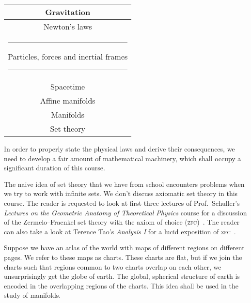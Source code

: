 \documentclass[a4 paper, 12pt]{book}
\theoremstyle{definition}
\begin{document}
    \begin{center}
        \renewcommand{\arraystretch}{1.3}
        \begin{tabular}{|c|}
            \hline
            Gravitation\\
            \hline
            Newton's laws\\
            \hline
            \rule{5pt}{0pt}Particles, forces and inertial frames\rule{5pt}{0pt}\\
            \hline
            Spacetime\\
            \hline
            Affine manifolds\\
            \hline
            Manifolds\\
            \hline
            Set theory\\
            \hline
        \end{tabular}
    \end{center}

    In order to properly state the physical laws and derive their consequences, we need to develop a fair amount of mathematical machinery, which shall occupy a significant duration of this course.

    The naive idea of set theory that we have from school encounters problems when we try to work with infinite sets. We don't discuss axiomatic set theory in this course. The reader is requested to look at first three lectures of Prof.\ Schuller's \textit{Lectures on the Geometric Anatomy of Theoretical Physics} course for a discussion of the Zermelo--Fraenkel set theory with the axiom of choice (\textsc{zfc})~\cite{Schuller_geometric_videos}. The reader can also take a look at Terence Tao's \textit{Analysis I} for a lucid exposition of \textsc{zfc}~\cite{Tao}.

    Suppose we have an atlas of the world with maps of different regions on different pages. We refer to these maps as charts. These charts are flat, but if we join the charts such that regions common to two charts overlap on each other, we unsurprisingly get the globe of earth. The global, spherical structure of earth is encoded in the overlapping regions of the charts. This idea shall be used in the study of manifolds.
\end{document}
